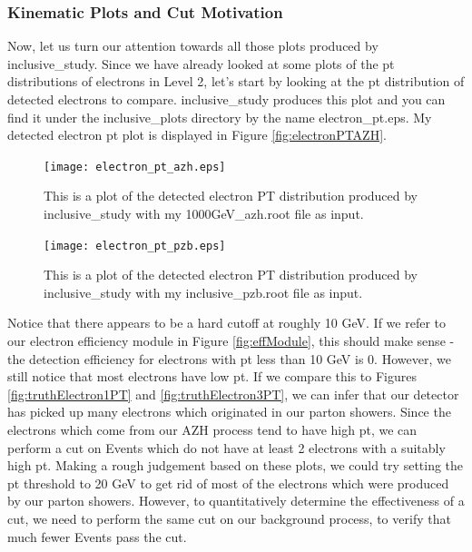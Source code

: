 \documentclass{article}
\begin{document}
\subsubsection{Kinematic Plots and Cut Motivation}

Now, let us turn our attention towards all those plots produced by inclusive\_study. Since we have already looked at some plots
of the pt distributions of electrons in Level 2, let's start by looking at the pt distribution of detected electrons to compare.
inclusive\_study produces this plot and you can find it under the inclusive\_plots directory by the name electron\_pt.eps. My
detected electron pt plot is displayed in Figure \ref{fig:electronPTAZH}.

\begin{figure}[!htbp]
\begin{minipage}{0.45\textwidth}
	\centering
	\texttt{[image: electron\_pt\_azh.eps]}
	\caption{This is a plot of the detected electron PT distribution produced by inclusive\_study with my 1000GeV\_azh.root file as input.}
	\label{fig:electronPTAZH}
\end{minipage}
\hspace{0.1\textwidth}
\begin{minipage}{0.45\textwidth}
	\centering
	\texttt{[image: electron\_pt\_pzb.eps]}
	\caption{This is a plot of the detected electron PT distribution produced by inclusive\_study with my inclusive\_pzb.root file as input.}
	\label{fig:electronPTPZB}
\end{minipage}
\end{figure}

\bigskip

Notice that there appears to be a hard cutoff at roughly 10 GeV. If we refer to our electron efficiency module in Figure \ref{fig:effModule}, this should make sense -
the detection efficiency for electrons with pt less than 10 GeV is 0. However, we still notice that most electrons have low pt. If we compare this to Figures \ref{fig:truthElectron1PT}
and \ref{fig:truthElectron3PT}, we can infer that our detector has picked up many electrons which originated in our parton showers. Since the electrons which come
from our AZH process tend to have high pt, we can perform a cut on Events which do not have at least 2 electrons with a suitably high pt. Making a rough judgement
based on these plots, we could try setting the pt threshold to 20 GeV to get rid of most of the electrons which were produced by our parton showers. However,
to quantitatively determine the effectiveness of a cut, we need to perform the same cut on our background process, to verify that much fewer Events pass the cut.
\end{document}

